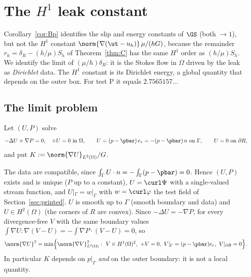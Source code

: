 
\section{The $H^1$ leak constant}\label{hc:sec}

Corollary~\ref{cor:Bp} identifies the slip and energy constants of $\GS$ (both $\to1$), but not the $H^1$ constant
$\norm{\nabla(\ut-u_h)}\,\mu/(hG)$, because the remainder $r_h=\delta_R-(h/\mu)S_h$ of Theorem~\ref{thm:C} has the same
$H^1$ order as $(h/\mu)S_h$. We identify the limit of $(\mu/h)\delta_R$: it is the Stokes flow in $\Omega$ driven by the
leak as \emph{Dirichlet} data. The $H^1$ constant is its Dirichlet energy, a global quantity that depends on the outer
box. For test P it equals $2.7565157\ldots$

\subsection{The limit problem}

\begin{definition}\label{hc:def}
Let $(U,P)$ solve
\[
-\Delta U+\nabla P=0,\quad \div U=0\ \text{in }\Omega,\qquad U=(p-\pbar)\,e_r=-(p-\pbar)\,n\ \text{on }\Gamma,\qquad U=0\ \text{on }\partial R ,
\]
and put $K:=\norm{\nabla U}_{L^2(\Omega)}/G$.
\end{definition}

The data are compatible, since $\int_\Gamma U\cdot n=-\int_\Gamma(p-\pbar)=0$. Hence $(U,P)$ exists and is unique ($P$ up to
a constant), $U=\curl\Psi$ with a single-valued stream function, and $U|_\Gamma=w|_\Gamma$ with $w=\curl\varphi$ the test field of
Section~\ref{sec:printed}. $U$ is smooth up to $\Gamma$ (smooth boundary and data) and $U\in H^2(\Omega)$ (the corners of $R$
are convex). Since $-\Delta U=-\nabla P$, for every divergence-free $V$ with the same boundary values
$\int\nabla U:\nabla(V-U)=-\int\nabla P\cdot(V-U)=0$, so
\begin{equation}\label{hc:min}
\norm{\nabla U}^2=\min\Bigl\{\norm{\nabla V}^2_{L^2(\Omega)}:\ V\in H^1(\Omega)^2,\ \div V=0,\ V|_\Gamma=(p-\pbar)e_r,\ V|_{\partial R}=0\Bigr\}.
\end{equation}
In particular $K$ depends on $p|_\Gamma$ \emph{and} on the outer boundary: it is not a local quantity.

